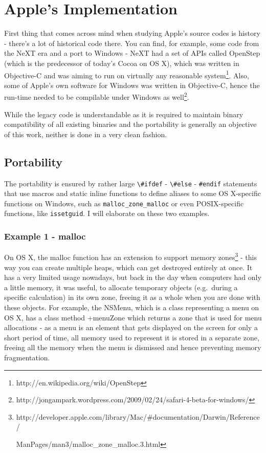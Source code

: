 \documentclass[a4paper, 11pt, fleqn]{book}
\begin{document}
\chapter{Apple's Implementation}

First thing that comes across mind when studying Apple's source codes is history - there's a lot of historical code there. You can find, for example, some code from the NeXT era and a port to Windows - NeXT had a set of APIs called OpenStep (which is the predecessor of today's Cocoa on OS X), which was written in Objective-C and was aiming to run on virtually any reasonable system\footnote{http://en.wikipedia.org/wiki/OpenStep}. Also, some of Apple's own software for Windows was written in Objective-C, hence the run-time needed to be compilable under Windows as well\footnote{http://jongampark.wordpress.com/2009/02/24/safari-4-beta-for-windows/}.

While the legacy code is understandable as it is required to maintain binary compatibility of all existing binaries and the portability is generally an objective of this work, neither is done in a very clean fashion.

\section{Portability}
The portability is ensured by rather large \verb=\#ifdef= - \verb=\#else= - \verb=#endif= statements that use macros and static inline functions to define aliases to some OS X-specific functions on Windows, such as \verb=malloc_zone_malloc= or even POSIX-specific functions, like \verb=issetguid=. I will elaborate on these two examples.

\subsection{Example 1 - malloc}
On OS X, the malloc function has an extension to support memory zones\footnote{http://developer.apple.com/library/Mac/\#documentation/Darwin/Reference/

ManPages/man3/malloc\_zone\_malloc.3.html} - this way you can create multiple heaps, which can get destroyed entirely at once. It has a very limited usage nowadays, but back in the day when computers had only a little memory, it was useful, to allocate temporary objects (e.g.\ during a specific calculation) in its own zone, freeing it as a whole when you are done with these objects. For example, the NSMenu, which is a class representing a menu on OS X, has a class method +menuZone which returns a zone that is used for menu allocations - as a menu is an element that gets displayed on the screen for only a short period of time, all memory used to represent it is stored in a separate zone, freeing all the memory when the menu is dismissed and hence preventing memory fragmentation.
\end{document}
